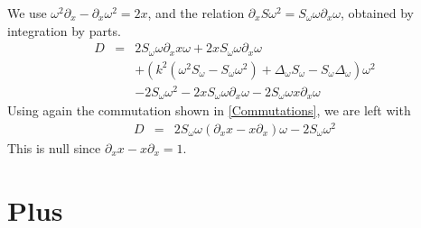 \documentclass[a4paper]{article}
\begin{document}
We use $\omega^2 \partial_x - \partial_x \omega^2 = 2x$, and the relation $\partial_x S \omega^2 = S_\omega \omega \partial_x \omega$, obtained by integration by parts. 
\begin{eqnarray*}
	D &=& 2 S_\omega \omega \partial_x x\omega + 2 x S_\omega  \omega \partial_x \omega \\
	&& + \left(k^2(\omega^2 S_\omega - S_\omega \omega^2) + \Delta_\omega S_\omega - S_\omega \Delta_\omega \right)\omega^2\\
	&& - 2 S_\omega \omega^2 - 2 x  S_\omega \omega \partial_x \omega - 2 S_\omega \omega x \partial_x \omega
\end{eqnarray*}
Using again the commutation shown in \autoref{Commutations}, we are left with 
\begin{eqnarray*}
	D &=&  2 S_\omega \omega (\partial_x x - x \partial_x) \omega - 2 S_\omega \omega^2
\end{eqnarray*}
This is null since $\partial_x x - x \partial_x = 1$. 

\section{Plus}












\end{document}
